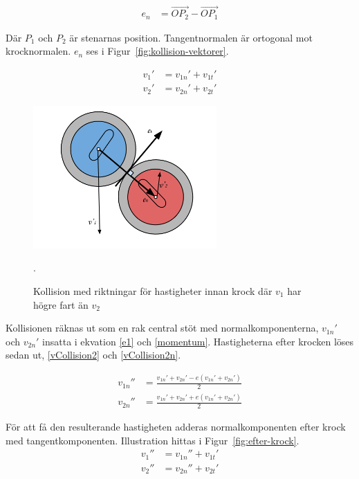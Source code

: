 \documentclass[11pt]{article} %
\begin{document}
 \begin{align}\label{e_normal}
e_n& = \overrightarrow{OP_2} -  \overrightarrow{OP_1}  
 \end{align}

Där $P_1$ och $P_2$ är stenarnas position. Tangentnormalen är ortogonal mot krocknormalen. $e_n$ ses i Figur~\ref{fig:kollision-vektorer}. 

 \begin{align}\label{vCollision}
v_1'& = v_{1n}' + v_{1t}'\\
v_2'& = v_{2n}' + v_{2t}'
 \end{align}

\begin{figure}[ht!]
\centering
\includegraphics[width=70mm]{kollision-vektorer.png}
\caption{Kollision med riktningar för hastigheter innan krock där $v_{1}$ har högre fart än $v_{2}$}.
\label{fig:kollision-vektorer}
\label{overflow}
\end{figure}

\pagebreak

Kollisionen räknas ut som en rak central stöt med normalkomponenterna, $v_{1n}'$ och  $v_{2n}'$ insatta i ekvation \eqref{e1} och \eqref{momentum}. Hastigheterna efter krocken löses sedan ut, \eqref{vCollision2} och \eqref{vCollision2n}.

 \begin{align}\label{vCollision2}
 v_{1n}''& = \frac{v_{1n}' + v_{2n}'  - e(v_{1n}' + v_{2n}')}{2} \\
 v_{2n}''& = \frac{v_{1n}' + v_{2n}'  + e(v_{1n}' + v_{2n}')}{2} \label{vCollision2n}
 \end{align}


För att få den resulterande hastigheten adderas normalkomponenten efter krock med tangentkomponenten. Illustration hittas i Figur~\ref{fig:efter-krock}. 
 \begin{align}\label{vfinal}
v_1''& = v_{1n}'' + v_{1t}'\\
v_2''& = v_{2n}'' + v_{2t}'
 \end{align}
\end{document}
